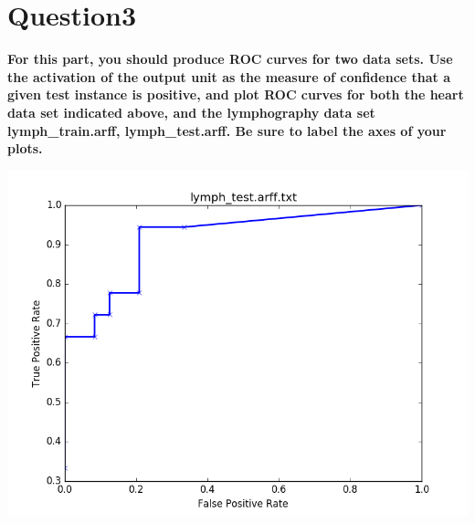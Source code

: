 \documentclass[paper=a4, fontsize=11pt]{scrartcl} %
\numberwithin{equation}{section} %
\numberwithin{figure}{section} %
\numberwithin{table}{section} %
\begin{document}
\newpage
\section*{Question3}
\textbf{For this part, you should produce ROC curves for two data sets. Use the activation of the output unit as the measure of confidence that a given test instance is positive, and plot ROC curves for both the heart data set indicated above, and the lymphography data set lymph\_train.arff, lymph\_test.arff. Be sure to label the axes of your plots.}

\begin{center}
\includegraphics[scale=.5]{pics/roc.png}
\end{center}
\end{document}
